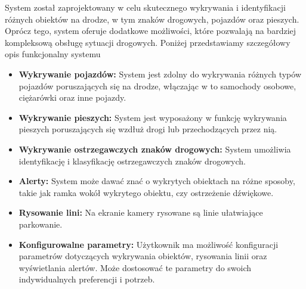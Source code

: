 System został zaprojektowany w celu skutecznego wykrywania i identyfikacji 
różnych obiektów na drodze, w tym znaków drogowych, pojazdów oraz pieszych. 
Oprócz tego, system oferuje dodatkowe możliwości, które pozwalają na bardziej 
kompleksową obsługę sytuacji drogowych. Poniżej przedstawiamy szczegółowy 
opis funkcjonalny systemu

\begin{itemize}
    \item \textbf{Wykrywanie pojazdów:} System jest zdolny do wykrywania różnych
     typów pojazdów poruszających się na drodze, włączając w to samochody osobowe, 
     ciężarówki oraz inne pojazdy.
    
     \item \textbf{Wykrywanie pieszych:} System jest wyposażony w funkcję wykrywania pieszych 
    poruszających się wzdłuż drogi lub przechodzących przez nią. 
    
    \item \textbf{Wykrywanie ostrzegawczych znaków drogowych:} System umożliwia identyfikację i klasyfikację 
    ostrzegawczych znaków drogowych.

    \item \textbf{Alerty:} System może dawać znać o wykrytych obiektach na różne sposoby, 
    takie jak ramka wokół wykrytego obiektu, czy ostrzeżenie dźwiękowe. 
    
    \item \textbf{Rysowanie lini:} Na ekranie kamery rysowane są linie ułatwiające parkowanie.

    \item \textbf{Konfigurowalne parametry:} Użytkownik ma możliwość konfiguracji parametrów dotyczących 
    wykrywania obiektów, rysowania linii oraz wyświetlania alertów. 
    Może dostosować te parametry do swoich indywidualnych preferencji i potrzeb.

\end{itemize}